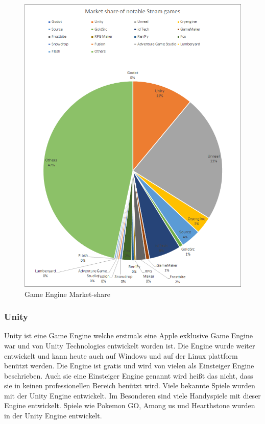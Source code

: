 \begin{figure}
    \includegraphics[scale=0.5]{pics/game_engine_marketshare}
    \caption{Game Engine Market-share}
    \label{fig:game_engine_marketshare}
\end{figure}

\subsubsection{Unity}

Unity ist eine Game Engine welche erstmals eine Apple exklusive Game Engine war und von Unity Technologies entwickelt worden ist.
Die Engine wurde weiter entwickelt und kann heute auch auf Windows und auf der Linux plattform benützt werden.
Die Engine ist gratis und wird von vielen als Einsteiger Engine beschrieben.
Auch sie eine Einsteiger Engine genannt wird heißt das nicht, dass sie in keinen professionellen Bereich benützt wird.
Viele bekannte Spiele wurden mit der Unity Engine entwickelt.
Im Besonderen sind viele Handyspiele mit dieser Engine entwickelt.
Spiele wie Pokemon GO, Among us und Hearthstone wurden in der Unity Engine entwickelt.

